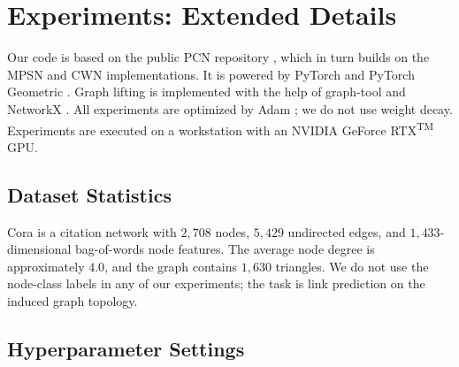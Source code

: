 \documentclass[letterpaper]{article} %
\begin{document}
\section{Experiments: Extended Details} \label{app:experiments}
Our code is based on the public PCN repository \cite{truong_weisfeiler_2024}, which in turn builds on the MPSN \cite{bodnar_weisfeiler_2021} and CWN \cite{bodnar_weisfeiler_2022} implementations. It is powered by PyTorch \cite{paszke_pytorch_2019} and PyTorch Geometric \cite{fey_fast_2019}. Graph lifting is implemented with the help of graph-tool \cite{peixoto_graph-tool_2014} and NetworkX \cite{hagberg_exploring_2008}. All experiments are optimized by Adam \cite{kingma_adam_2015}; we do not use weight decay. Experiments are executed on a workstation with an NVIDIA\textsuperscript{\textregistered} GeForce\textsuperscript{\textregistered} RTX\textsuperscript{TM} GPU.

\subsection{Dataset Statistics} \label{app:data}
Cora \cite{sen_collective_2008} is a citation network with \(2,\!708\) nodes, \(5,\!429\) undirected edges, and \(1,\!433\)-dimensional bag-of-words node features. The average node degree is approximately \(4.0\), and the graph contains \(1,\!630\) triangles. We do not use the node-class labels in any of our experiments; the task is link prediction on the induced graph topology.

\subsection{Hyperparameter Settings} \label{app:hparams}
\end{document}
